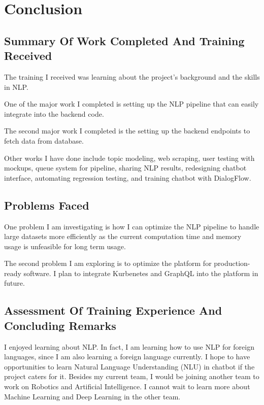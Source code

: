 \section{Conclusion}
\subsection{Summary Of Work Completed And Training Received}
\noindent
The training I received was learning about the project's background and the skills in NLP.

\noindent
One of the major work I completed is setting up the NLP pipeline that can easily integrate into the backend code.

\noindent
The second major work I completed is the setting up the backend endpoints to fetch data from database.

\noindent
Other works I have done include topic modeling, web scraping, user testing with mockups, queue system for pipeline, sharing NLP results, redesigning chatbot interface, automating regression testing, and training chatbot with DialogFlow.
 
\subsection{Problems Faced}
\noindent
One problem I am investigating is how I can optimize the NLP pipeline to handle large datasets more efficiently as the current computation time and memory usage is unfeasible for long term usage.

\noindent
The second problem I am exploring is to optimize the platform for production-ready software. I plan to integrate Kurbenetes and GraphQL into the platform in future.

\subsection{Assessment Of Training Experience And Concluding Remarks}
\noindent
I enjoyed learning about NLP. In fact, I am learning how to use NLP for foreign languages, since I am also learning a foreign language currently. I hope to have opportunities to learn Natural Language Understanding (NLU) in chatbot if the project caters for it. Besides my current team, I would be joining another team to work on Robotics and Artificial Intelligence. I cannot wait to learn more about Machine Learning and Deep Learning in the other team.
